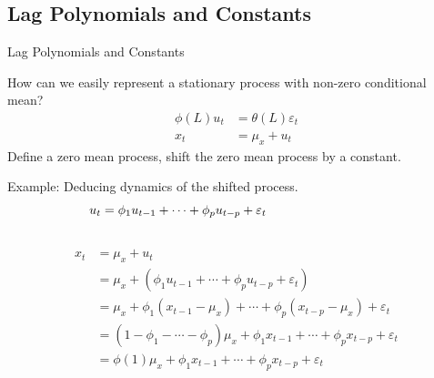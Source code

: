 \documentclass[handout]{beamer}
\begin{document}


\subsection{Lag Polynomials and Constants}


\begin{frame}[shrink]{Lag Polynomials and Constants}

How can we easily represent a stationary process with non-zero
conditional mean?
\begin{align*}
  \phi(L)u_t &=
  \theta(L)\varepsilon_t
  \\
  x_t
  &= \mu_x + u_t
\end{align*}
Define a zero mean process, shift the zero mean process by a constant.

Example: Deducing dynamics of the shifted process.
\begin{align*}
  u_t
  &=
  \phi_1 u_{t-1}
  +
  \cdots
  +
  \phi_p u_{t-p}
  + \varepsilon_t
  \\
  &
  \hphantom{%
  (1-\phi_1-\cdots-\phi_p)\mu_x
  + \phi_1 x_{t-1}
  + \cdots
  + \phi_p x_{t-p}
  + \varepsilon_t
  }
\end{align*}
\pause
\vspace{-50pt}
\begin{align*}
  x_t
  &= \mu_x + u_t
  \\
  &= \mu_x
  +
  \left(
  \phi_1 u_{t-1}
  +
  \cdots
  +
  \phi_p u_{t-p}
  + \varepsilon_t
  \right)
  \\
  &=
  \mu_x
  +
  \phi_1 (x_{t-1}-\mu_x)
  +
  \cdots
  +
  \phi_p (x_{t-p}-\mu_x)
  + \varepsilon_t
  \\
  &=
  (1-\phi_1-\cdots-\phi_p)\mu_x
  + \phi_1 x_{t-1}
  + \cdots
  + \phi_p x_{t-p}
  + \varepsilon_t
  \\
  &=
  \phi(1)\mu_x
  + \phi_1 x_{t-1}
  + \cdots
  + \phi_p x_{t-p}
  + \varepsilon_t
\end{align*}
\end{frame}
\end{document}
